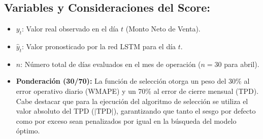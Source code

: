 \documentclass[11pt,a4paper]{report}
\begin{document}
            \subsection*{Variables y Consideraciones del Score:}
            \begin{itemize}
                \item \textbf{$y_t$}: Valor real observado en el día $t$ (Monto Neto de Venta).
                \item \textbf{$\hat{y}_t$}: Valor pronosticado por la red LSTM para el día $t$.
                \item \textbf{$n$}: Número total de días evaluados en el mes de operación ($n = 30$ para abril).
                \item \textbf{Ponderación (30/70):} La función de selección otorga un peso del 30\% al error operativo diario (WMAPE) y un 70\% al error de cierre mensual (TPD). Cabe destacar que para la ejecución del algoritmo de selección se utiliza el valor absoluto del TPD ($|\text{TPD}|$), garantizando que tanto el sesgo por defecto como por exceso sean penalizados por igual en la búsqueda del modelo óptimo.
            \end{itemize}
\end{document}
